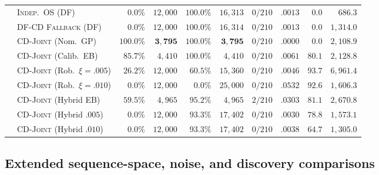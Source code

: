 \documentclass{article}
\theoremstyle{plain}
\theoremstyle{definition}
\begin{document}
\begin{table}[!htbp]
{\begin{tabular}{@{}llrrrrrrrr@{}}
 & \textsc{Indep.\ OS} (DF) & $0.0\%$ & $12{,}000$ & $100.0\%$ & $16{,}313$ & $0/210$ & $.0013$ & $0.0$ & $686.3$ \\
 & \textsc{DF-CD Fallback} (DF) & $0.0\%$ & $12{,}000$ & $100.0\%$ & $16{,}314$ & $0/210$ & $.0013$ & $0.0$ & $1{,}314.0$ \\
 & \textsc{CD-Joint} (Nom.\ GP) & $100.0\%$ & $\mathbf{3{,}795}$ & $100.0\%$ & $\mathbf{3{,}795}$ & $0/210$ & $.0000$ & $0.0$ & $2{,}108.9$ \\
 & \textsc{CD-Joint} (Calib.\ EB) & $85.7\%$ & $4{,}410$ & $100.0\%$ & $4{,}410$ & $0/210$ & $.0061$ & $80.1$ & $2{,}128.8$ \\
 & \textsc{CD-Joint} (Rob.\ $\xi=.005$) & $26.2\%$ & $12{,}000$ & $60.5\%$ & $15{,}360$ & $0/210$ & $.0046$ & $93.7$ & $6{,}961.4$ \\
 & \textsc{CD-Joint} (Rob.\ $\xi=.010$) & $0.0\%$ & $12{,}000$ & $0.0\%$ & $25{,}000$ & $0/210$ & $.0532$ & $92.6$ & $1{,}606.3$ \\
 & \textsc{CD-Joint} (Hybrid EB) & $59.5\%$ & $4{,}965$ & $95.2\%$ & $4{,}965$ & $2/210$ & $.0303$ & $81.1$ & $2{,}670.8$ \\
 & \textsc{CD-Joint} (Hybrid $.005$) & $0.0\%$ & $12{,}000$ & $93.3\%$ & $17{,}402$ & $0/210$ & $.0030$ & $78.8$ & $1{,}573.1$ \\
 & \textsc{CD-Joint} (Hybrid $.010$) & $0.0\%$ & $12{,}000$ & $93.3\%$ & $17{,}402$ & $0/210$ & $.0038$ & $64.7$ & $1{,}305.0$ \\
\bottomrule
\end{tabular}%
}
\end{table}

\subsection{Extended sequence-space, noise, and discovery comparisons}
\end{document}
